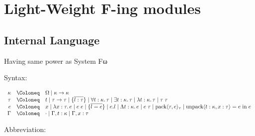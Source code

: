 \section{Light-Weight F-ing modules}

\cite{Rossberg:2014}

\subsection{Internal Language}
\label{section:fing-modules-internal-language}

Having same power as System Fω

Syntax:

\begin{align*}
  \begin{array}{rcl}
  \kappa
  & \Coloneq & \Omega \mid \kappa \to \kappa
  \\
  \tau
  & \Coloneq & t
  \mid \tau \to \tau
  \mid \{\overline{l: \tau}\}
  \mid \forall t: \kappa\ldotp \tau
  \mid \exists t: \kappa\ldotp \tau
  \mid \lambda t: \kappa\ldotp \tau
  \mid \tau\; \tau
  \\
  e
  & \Coloneq & x
  \mid \lambda x: \tau\ldotp e
  \mid e\; e
  \mid \{\overline{l = e}\}
  \mid e . l
  \mid \Lambda t: \kappa\ldotp e
  \mid e\; \tau
  \mid \sympack \langle \tau, e\rangle_\tau
  \mid \symunpack \langle t: \kappa, x: \tau\rangle = e \symin e
  \\
  \Gamma
  & \Coloneq & \cdot
  \mid \Gamma, t: \kappa
  \mid \Gamma, x: \tau
  \end{array}
\end{align*}

Abbreviation:

